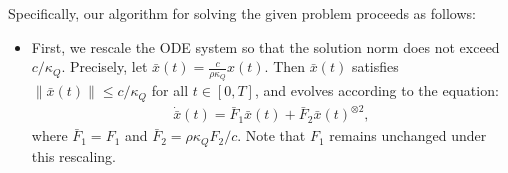 \documentclass[superscriptaddress,onecolumn,nofootinbib,longbibliography,a4paper,accepted=2026-09-29]{quantumarticle}
\theoremstyle{plain}
\theoremstyle{definition}
\numberwithin{thm}{section}
\numberwithin{assumption}{section}
\numberwithin{lemma}{section}
\numberwithin{prop}{section}
\numberwithin{cor}{section}
\numberwithin{definition}{section}
\numberwithin{rmk}{section}
\numberwithin{equation}{section}
\newcommand{\norm}[1]     {\left\| #1 \right\|}
\begin{document}
Specifically, our algorithm for solving the given problem proceeds as follows:

\begin{itemize}
\item First, we rescale the ODE system so that the solution norm does not exceed $c/\kappa_Q$. Precisely, let $\bar{x}(t)= \frac{c}{\rho\kappa_Q} x(t)$. Then \( \bar{x}(t) \) satisfies $\norm{\bar{x}(t)} \le c /\kappa_Q$ for all $t \in [0,T]$, and evolves according to the equation:
\begin{align}
\dot{\bar{x}}(t) = \bar{F}_1 \bar{x}(t) + \bar{F}_2  \bar{x}(t)^{\otimes 2},
\label{eq:ode_system_with_rescaled_solution}
\end{align}
where $\bar{F}_1=F_1$ and 
\( \bar{F}_2 = \rho \kappa_Q  F_2 / c \). Note that $F_1$ remains unchanged under this rescaling. 


\end{itemize}
\end{document}
